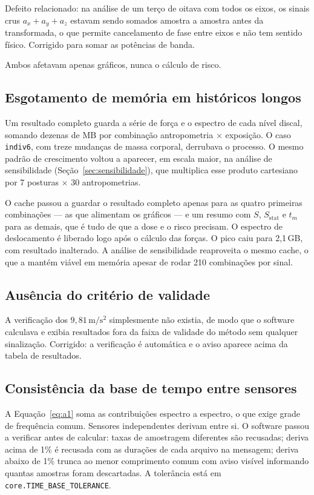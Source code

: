 \documentclass[11pt,a4paper]{article}
\newcommand{\code}[1]{\texttt{\small #1}}
\newcommand{\unit}[2]{\ensuremath{#1\,\mathrm{#2}}}
\begin{document}
Defeito relacionado: na análise de um terço de oitava com todos os eixos, os
sinais crus $a_x + a_y + a_z$ estavam sendo somados amostra a amostra antes da
transformada, o que permite cancelamento de fase entre eixos e não tem sentido
físico. Corrigido para somar as potências de banda.

Ambos afetavam apenas gráficos, nunca o cálculo de risco.

\subsection{Esgotamento de memória em históricos longos}

Um resultado completo guarda a série de força e o espectro de cada nível discal,
somando dezenas de MB por combinação antropometria $\times$ exposição. O caso
\code{indiv6}, com treze mudanças de massa corporal, derrubava o processo. O
mesmo padrão de crescimento voltou a aparecer, em escala maior, na análise de
sensibilidade (Seção~\ref{sec:sensibilidade}), que multiplica esse produto
cartesiano por 7 posturas $\times$ 30 antropometrias.

O cache passou a guardar o resultado completo apenas para as quatro primeiras
combinações --- as que alimentam os gráficos --- e um resumo com $S$,
$S_{\mathrm{stat}}$ e $t_m$ para as demais, que é tudo de que a dose e o risco
precisam. O espectro de deslocamento é liberado logo após o cálculo das forças.
O pico caiu para 2,1\,GB, com resultado inalterado. A análise de sensibilidade
reaproveita o mesmo cache, o que a mantém viável em memória apesar de rodar 210
combinações por sinal.

\subsection{Ausência do critério de validade}

A verificação dos \unit{9{,}81}{m/s^2} simplesmente não existia, de modo que o
software calculava e exibia resultados fora da faixa de validade do método sem
qualquer sinalização. Corrigido: a verificação é automática e o aviso aparece
acima da tabela de resultados.

\subsection{Consistência da base de tempo entre sensores}

A Equação~\eqref{eq:a1} soma as contribuições espectro a espectro, o que exige
grade de frequência comum. Sensores independentes derivam entre si. O software
passou a verificar antes de calcular: taxas de amostragem diferentes são
recusadas; deriva acima de 1\% é recusada com as durações de cada arquivo na
mensagem; deriva abaixo de 1\% trunca ao menor comprimento comum com aviso
visível informando quantas amostras foram descartadas. A tolerância está em
\code{core.TIME\_BASE\_TOLERANCE}.
\end{document}
